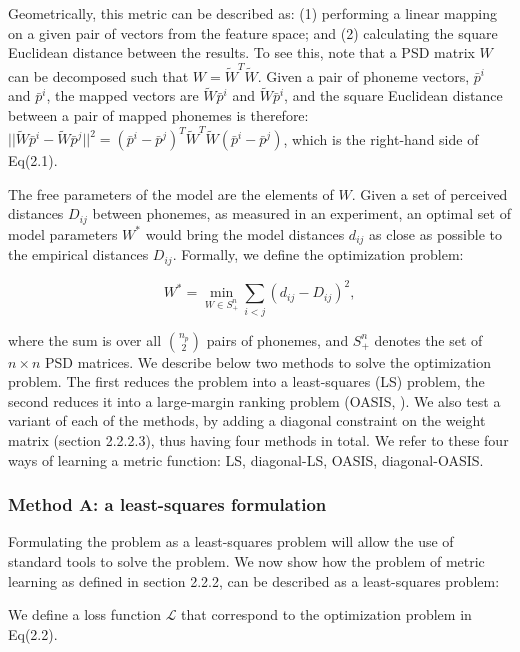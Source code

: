 Geometrically, this metric can be described as: (1) performing a linear mapping on a given pair of vectors from the feature space; and (2) calculating the square Euclidean distance between the results. To see this, note that a PSD matrix $W$ can be decomposed such that $W = \widetilde{W}^T\widetilde{W}$. Given a pair of phoneme vectors, $\bar{p}^i$ and $\bar{p}^i$, the mapped vectors are $\widetilde{W}\bar{p}^i$ and $\widetilde{W}\bar{p}^i$, and the square Euclidean distance between a pair of mapped phonemes is therefore: $||\widetilde{W}\bar{p}^i - \widetilde{W}\bar{p}^j||^2 = (\bar{p}^i - \bar{p}^j)^T\widetilde{W}^T\widetilde{W}(\bar{p}^i - \bar{p}^j)$, which is the right-hand side of Eq(2.1).

The free parameters of the model are the elements of $W$. Given a set of perceived distances ${D_{ij}}$ between phonemes, as measured in an experiment, an optimal set of model parameters $W^\ast$ would bring the model distances $d_{ij}$ as close as possible to the empirical distances $D_{ij}$. Formally, we define the optimization problem:

\begin{equation}
    W^\ast = \min_{W \in S^n_+}{{\sum_{{i} < {j}}{(d_{ij} - D_{ij})^2}}},
\end{equation}

where the sum is over all ${n_p \choose 2}$ pairs of phonemes, and $S^n_+$ denotes the set of $n \times n$ PSD matrices. We describe below two methods to solve the optimization problem. The first reduces the problem into a least-squares (LS) problem, the second reduces it into a large-margin ranking problem (OASIS, \citealp{Chechik2010}). We also test a variant of each of the methods, by adding a diagonal constraint on the weight matrix (section 2.2.2.3), thus having four methods in total. We refer to these four ways of learning a metric function: LS, diagonal-LS, OASIS, diagonal-OASIS.

\subsubsection{Method A: a least-squares formulation}
Formulating the problem as a least-squares problem will allow the use of standard tools to solve the problem. We now show how the problem of metric learning as defined in section 2.2.2, can be described as a least-squares problem:

We define a loss function $\mathcal{L}$ that correspond to the optimization problem in Eq(2.2).

